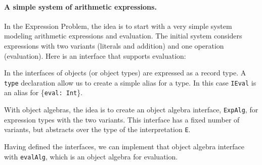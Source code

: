 
\paragraph{A simple system of arithmetic expressions.} 
In the Expression Problem, the idea is to start with a very simple
system modeling arithmetic expressions and evaluation.
The initial system considers expressions with two variants (literals and
addition) and one operation (evaluation). Here is an interface that supports
evaluation:
\begin{comment}
  \begin{lstlisting}{language=F2J}
    type IEval = {eval: Int};
  \end{lstlisting}
\end{comment}

\noindent In \name the interfaces of objects (or object types) are expressed as
a record type. A \lstinline{type} declaration allow us to create a
simple alias for a type.  In this case \lstinline{IEval} is an alias
for \{\lstinline{eval: Int}\}.

With object algebras, the idea is to create an object algebra
interface, \lstinline$ExpAlg$, for expression types with the two
variants. This interface has a fixed number of variants, but abstracts over the
type of the interpretation \lstinline$E$.

\begin{comment}
  \begin{lstlisting}{language=F2J}
    type ExpAlg[E] = {
      lit: Int -> E, 
      add: E -> E -> E
    };
  \end{lstlisting}
\end{comment}


Having defined the interfaces, we can implement that object algebra interface
with \lstinline$evalAlg$, which is an object algebra for evaluation. 
\begin{comment}
  \begin{lstlisting}{language=F2J}
    let evalAlg: ExpAlg[IEval] = {
      lit = \(x: Int) -> {eval = x},
      add = \(x: IEval) (y: IEval) -> {
        eval = x.eval + y.eval
      }
    };
  \end{lstlisting}
\end{comment}

